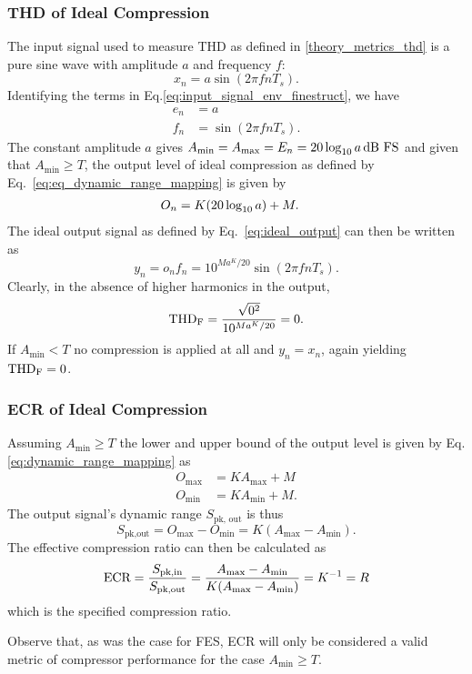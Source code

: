 \documentclass[../main2.tex]{subfiles}
\begin{document}
\subsubsection{THD of Ideal Compression}
The input signal used to measure THD as defined in \ref{theory_metrics_thd} is a pure sine wave with amplitude $a$ and frequency $f$:
\begin{equation}
x_n = a \sin( 2 \pi f n T_s ).
\end{equation}
Identifying the terms in Eq.\eqref{eq:input_signal_env_finestruct}, we have
\begin{equation}
\begin{split}
e_n &= a \\
f_n &= \sin( 2 \pi f n T_s ).
\end{split}
\end{equation}
The constant amplitude $a$ gives $A_\text{min} = A_\text{max} = E_n = 20 \log_{10} a \mskip3mu\text{dB FS}$ and given that $A_\text{min} \geq T$, the output level of ideal compression as defined by Eq.~\eqref{eq:eq_dynamic_range_mapping} is given by
\begin{equation}
\begin{split}
O_n &= K (20 \log_{10} a) + M.
\end{split}
\end{equation}
The ideal output signal as defined by Eq.~\eqref{eq:ideal_output} can then be written as
\begin{equation}
y_n = o_n f_n = 10^{Ma^K/20} \sin(2 \pi f n T_s).
\end{equation}
Clearly, in the absence of higher harmonics in the output,
\begin{equation}
\text{THD}_\text{F} = \frac{\sqrt{0^2}}{10^{Ma^K/20}} = 0.
\end{equation}
If $A_\text{min} < T$ no compression is applied at all and $y_n = x_n$, again yielding $\text{THD}_\text{F} = 0$.

\subsubsection{ECR of Ideal Compression}
Assuming $A_\text{min} \geq T$ the lower and upper bound of the output level is given by Eq.\eqref{eq:dynamic_range_mapping} as
\begin{equation}
\begin{split}
O_\text{max} &= K A_\text{max} + M\\
O_\text{min} &= K A_\text{min} + M.
\end{split}
\end{equation}
The output signal's dynamic range $S_\text{pk, out}$ is thus
\begin{equation}
S_\text{pk,out} = O_\text{max} - O_\text{min} = K (A_\text{max} - A_\text{min}).\end{equation}
The effective compression ratio can then be calculated as
\begin{equation}
\text{ECR} = \frac{S_\text{pk,in}}{S_\text{pk,out}} = \frac{A_\text{max} - A_\text{min}}{K(A_\text{max} - A_\text{min})} = K^{-1} = R
\end{equation}
which is the specified compression ratio.

Observe that, as was the case for FES, ECR will only be considered a valid metric of compressor performance for the case $A_\text{min} \geq T$.
\end{document}
